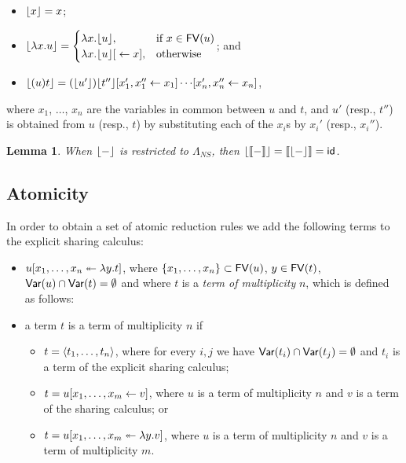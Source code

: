 \documentclass[10pt,a4paper]{article}
\theoremstyle{definition}
\theoremstyle{plain}
\newtheorem{lemma}[definition]{Lemma}
\theoremstyle{remark}
\begin{document}
\begin{itemize}
	\item ${\lfloor{x}\rfloor}=x$;
	\item ${\lfloor{\lambda x.u}\rfloor}=
	  \begin{cases}
	      \lambda x.{\lfloor{u}\rfloor}, & \mbox{if }x\in{\mathop{\mathsf{FV}}}(u) \\
	      \lambda x.{{ {{\lfloor{u}\rfloor}}[{}\leftarrow{x}] }}, & \mbox{otherwise}
	  \end{cases}$; and
	\item ${\lfloor{(u)t}\rfloor}={ { {{ { {({\lfloor{u'}\rfloor}){\lfloor{t''}\rfloor}}[{{x'_1},{x''_1}}\leftarrow{x_1}] } }\cdots}[{{x'_n},{x''_n}}\leftarrow{x_n}] } }$,
\end{itemize}
where $x_1$, $\dots$, $x_n$ are the variables in common between $u$ and $t$, and $u'$ (resp., $t''$) is obtained from $u$ (resp., $t$) by substituting each of the $x_i$s by $x_i'$ (resp., $x_i''$).

\begin{lemma}
 When ${\lfloor{-}\rfloor}$ is restricted to $\Lambda_{NS}$, then ${\lfloor{{\llbracket{-}\rrbracket}}\rfloor}={\llbracket{{\lfloor{-}\rfloor}}\rrbracket}=\mathsf{id}$.
\end{lemma}

\subsection{Atomicity}

In order to obtain a set of atomic reduction rules we add the following terms to the explicit sharing calculus:

\begin{itemize}
	\item ${ { {u}[{{x_1},\dots,{x_n}}\twoheadleftarrow{\lambda{y}.{t}}] } }$, where $\{x_1,\dots,x_n\}\subset{\mathop{\mathsf{FV}}}(u)$, $y\in{\mathop{\mathsf{FV}}}(t)$, ${\mathop{\mathsf{Var}}}(u)\cap{\mathop{\mathsf{Var}}}(t)=\emptyset$ and where $t$ is a \emph{term of multiplicity} $n$, which is defined as follows:
	\item a term $t$ is a term of multiplicity $n$ if
	\begin{itemize}
	  \item $t={ {\langle} {t_1},\dots,{t_n} {\rangle} }$, where for every $i,j$ we have ${\mathop{\mathsf{Var}}}(t_i)\cap{\mathop{\mathsf{Var}}}(t_j)=\emptyset$ and $t_i$ is a term of the explicit sharing calculus;
	  \item $t={ { {u}[{{x_1},\dots,{x_m}}\leftarrow{v}] } }$, where $u$ is a term of multiplicity $n$ and $v$ is a term of the sharing calculus; or
	  \item $t={ { {u}[{{x_1},\dots,{x_m}}\twoheadleftarrow{\lambda{y}.{v}}] } }$, where $u$ is a term of multiplicity $n$ and $v$ is a term of multiplicity $m$.
	\end{itemize}
\end{itemize}
\end{document}

